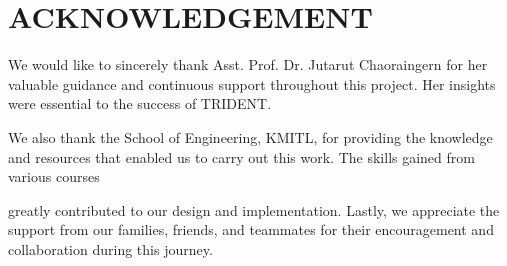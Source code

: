\chapter*{ACKNOWLEDGEMENT}

We would like to sincerely thank Asst. Prof. Dr. Jutarut Chaoraingern for her
valuable guidance and continuous support throughout this project. Her insights were essential to the success of TRIDENT.

We also thank the School of Engineering, KMITL, for providing the knowledge
and resources that enabled us to carry out this work. The skills gained from various courses

greatly contributed to our design and implementation.
Lastly, we appreciate the support from our families, friends, and teammates
for their encouragement and collaboration during this journey.


